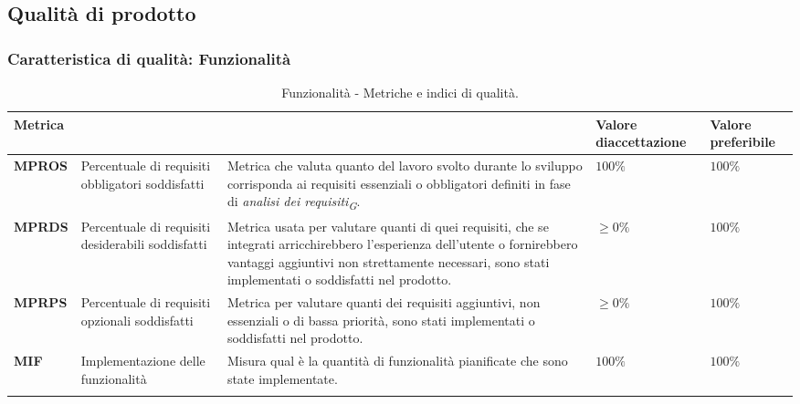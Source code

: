 \subsection{Qualità di prodotto}

\subsubsection{Caratteristica di qualità: Funzionalità}
\begin{longtable}{|C{1.9cm}|L{4cm}|L{4cm}|L{2.2cm}|L{2.1cm}|}
    \hline
    \textbf{Metrica} &  &  & \textbf{Valore di\linebreak accettazione} & {\textbf{Valore \linebreak preferibile}} \\
    \hline \hline

    \textbf{MPROS} & Percentuale di requisiti obbligatori soddisfatti & Metrica che valuta quanto del lavoro svolto durante lo sviluppo corrisponda ai requisiti essenziali o obbligatori definiti in fase di \textit{analisi dei requisiti}\textsubscript{\textit{G}}.  & $ 100\%$  & $ 100\%$ \\
    \hline

    \textbf{MPRDS} & Percentuale di requisiti desiderabili soddisfatti & Metrica usata per valutare quanti di quei requisiti, che se integrati arricchirebbero l'esperienza dell'utente o fornirebbero vantaggi aggiuntivi non strettamente necessari, sono stati implementati o soddisfatti nel prodotto. & $\geq 0\%$ & $100\%$ \\
    \hline

    \textbf{MPRPS} & Percentuale di requisiti opzionali soddisfatti & Metrica per valutare quanti dei requisiti aggiuntivi, non essenziali o di bassa priorità, sono stati implementati o soddisfatti nel prodotto. & $\geq 0\%$ & $100\%$ \\
    \hline

    \textbf{MIF} & Implementazione delle funzionalità & Misura qual è la quantità di funzionalità pianificate che sono state implementate. & $ 100\%$ & $ 100\%$ \\
    \hline

    \caption{Funzionalità - Metriche e indici di qualità.}
    \label{tab:metriche_funzionalità_testo}
\end{longtable}

